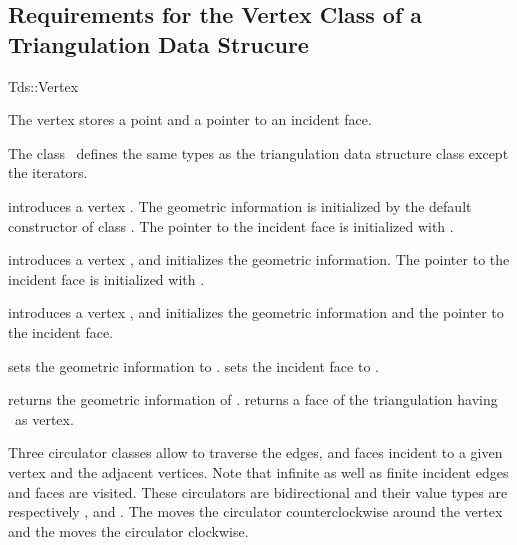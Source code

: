\subsection{Requirements for the Vertex Class of a Triangulation Data Strucure}
\label{I1_Sect_Tds_Vertex}
\begin{ccClass}{Tds::Vertex}

\ccThreeToTwo

The vertex stores a point and a pointer to an incident face.

\ccInheritsFrom {}

\ccTypes
The class \ccClassName\
defines the same types as the triangulation data structure class 
except the iterators.
\begin{ccAdvanced}

\ccCreation

{introduces a vertex \ccVar. The geometric information is
 initialized by the default constructor of class .
The pointer to the incident face is initialized with .}

{introduces a vertex \ccVar, and initializes the geometric information.
The pointer to the incident face is initialized with \ccc{NULL}.}

{introduces a vertex \ccVar, and initializes the geometric information and 
the pointer to the incident face.}



{sets the geometric information to .}
\ccGlue
{}
{sets the incident face to .}


\end{ccAdvanced}



{returns  the geometric information of \ccVar.}
\ccGlue
{}
{returns a face of the triangulation having  \ccVar\ as vertex.}

Three circulator classes allow to traverse the edges, and faces
incident to a given vertex and the adjacent vertices.
Note that infinite as well as finite incident edges and faces are visited.
 These circulators are bidirectional
and their value types are respectively , 
and .
The   moves the circulator
counterclockwise around the vertex 
and  the  moves the circulator
clockwise. 


\end{ccClass}
